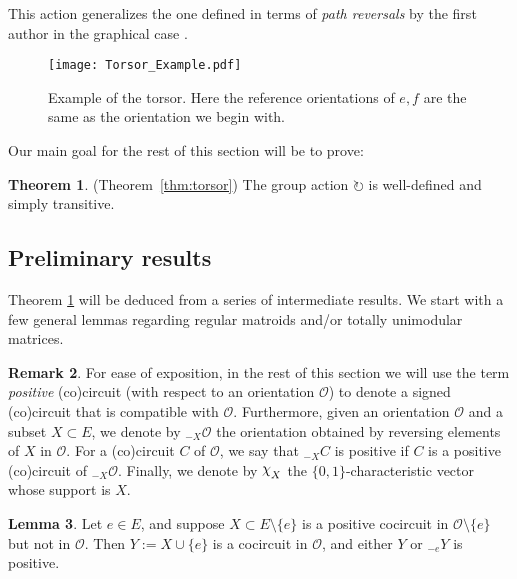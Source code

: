 \documentclass[12pt]{amsart}
\numberwithin{equation}{section}
\theoremstyle{definition}
\newtheorem{theorem}{Theorem}[subsection]
\newtheorem{lemma}[theorem]{Lemma}
\newtheorem{remark}[theorem]{Remark}
\DeclareRobustCommand{\rchi}{{\mathpalette\irchi\relax}}
\newcommand{\irchi}[2]{\raisebox{\depth}{$#1\chi$}}
\begin{document}
This action generalizes the one defined in terms of {\em path reversals} by the first author in the graphical case \cite[Section 5]{backman2014riemann}.



\begin{figure}[ht!]
\begin{center}
    \texttt{[image: Torsor\_Example.pdf]}
\end{center}
  \caption{Example of the torsor. Here the reference orientations of $e,f$ are the same as the orientation we begin with.}
  \label{Torsor_Example}
\end{figure}



Our main goal for the rest of this section will be to prove:

\begin{theorem} \label{Thm:Action}
(Theorem~\ref{thm:torsor})
The group action $\circlearrowright$ is well-defined and simply transitive. 
\end{theorem}

\subsection{Preliminary results}

Theorem \ref{Thm:Action} will be deduced from a series of intermediate results. We start with a few general lemmas regarding regular matroids and/or totally unimodular matrices.

\begin{remark}
For ease of exposition, in the rest of this section we will use the term {\em positive} (co)circuit (with respect to an orientation $\mathcal{O}$) to denote a signed (co)circuit that is compatible with $\mathcal{O}$. Furthermore, given an orientation $\mathcal{O}$ and a subset $X\subset E$, we denote by $_{-X}\mathcal{O}$ the orientation obtained by reversing elements of $X$ in $\mathcal{O}$.  For a (co)circuit $C$ of $\mathcal{O}$, we say that $_{-X}C$ is positive if $C$ is a positive (co)circuit of $_{-X}\mathcal{O}$. Finally, we denote by $\rchi_X$ the $\{0,1\}$-characteristic vector whose support is $X$.
\end{remark}

\begin{lemma} \label{Lem:ExtendCC}
Let $e\in E$, and suppose $X\subset E\setminus \{e\}$ is a positive cocircuit in $\mathcal{O}\setminus\{e\}$ but not in $\mathcal{O}$. Then $Y:=X\cup\{e\}$ is a cocircuit in $\mathcal{O}$, and either $Y$ or $_{-e}Y$ is positive.
\end{lemma}
\end{document}
